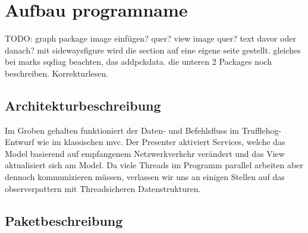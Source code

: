 \chapter{Aufbau \gls{programname}}
\label{ch:aufbau_programname}
                                        TODO:
                                        graph package image einfügen? quer? view image quer? text davor oder danach? mit sidewaysfigure wird die section auf eine eigene seite gestellt.
                                        gleiches bei marks sqdiag beachten, das addpckdata.
                                        die unteren 2 Packages noch beschreiben.
                                        Korrekturlesen.
\section{Architekturbeschreibung}
Im Groben gehalten funktioniert der Daten- und Befehlsfluss im Trufflehog-Entwurf
wie im klassischen \gls{mvc}. Der Presenter aktiviert Services, welche das Model basierend
auf empfangenem Netzwerkverkehr verändert und das View aktualisiert sich am Model.
Da viele Threads im Programm parallel arbeiten aber dennoch kommunizieren müssen,
verlassen wir uns an einigen Stellen auf das \gls{observerpattern} mit
Threadsicheren Datenstrukturen.\newline
\newline

\section{Paketbeschreibung}













\medskip

